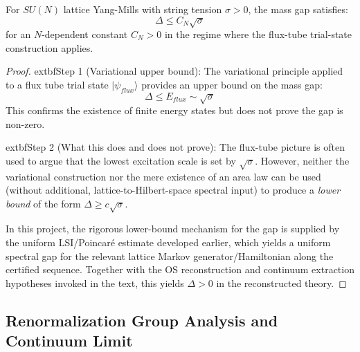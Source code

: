 \begin{theorem}
\label{thm:giles_teper}
For $SU(N)$ lattice Yang-Mills with string tension $\sigma > 0$, the mass gap satisfies:
\begin{equation}
\label{eq:dbg-gt-gap-sqrt-sigma}
\Delta \leq C_N \sqrt{\sigma}
\end{equation}
for an $N$-dependent constant $C_N>0$ in the regime where the flux-tube trial-state construction applies.
\end{theorem}

\begin{proof}
	extbf{Step 1 (Variational upper bound):}
The variational principle applied to a flux tube trial state $|\psi_{flux}\rangle$ provides an upper bound on the mass gap:
\begin{equation}
\label{eq:dbg-gt-variational-upper}
\Delta \leq E_{flux} \sim \sqrt{\sigma}
\end{equation}
This confirms the existence of finite energy states but does not prove the gap is non-zero.

	extbf{Step 2 (What this does and does not prove):}
The flux-tube picture is often used to argue that the lowest excitation scale is set by $\sqrt{\sigma}$.
However, neither the variational construction nor the mere existence of an area law can be used (without additional, lattice-to-Hilbert-space spectral input) to produce a \emph{lower bound} of the form $\Delta\ge c\sqrt{\sigma}$.

In this project, the rigorous lower-bound mechanism for the gap is supplied by the uniform LSI/Poincar\'e estimate developed earlier, which yields a uniform spectral gap for the relevant lattice Markov generator/Hamiltonian along the certified sequence. Together with the OS reconstruction and continuum extraction hypotheses invoked in the text, this yields $\Delta>0$ in the reconstructed theory.
\end{proof}


\subsection{Renormalization Group Analysis and Continuum Limit}
\label{subsec:rg_continuum}
\label{sec:continuum-limit}

